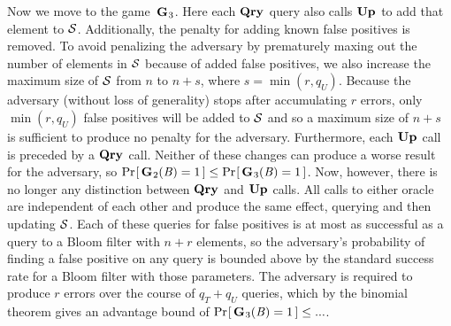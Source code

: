{Now we move to the game~$\textup{\textbf{G}}\hspace{0.5pt}_3$. Here each $\textup{\textbf{Qry}}\hspace{0.5pt}$ query also calls $\textup{\textbf{Up}}\hspace{0.5pt}$ to
add that element to $\mathcal{S}$.   Additionally, the penalty for adding known false
positives is removed. To avoid penalizing the adversary by prematurely maxing
out the number of elements in $\mathcal{S}$ because of added false positives, we also
increase the maximum size of $\mathcal{S}$ from $n$ to $n+s$, where $s = \min(r,q_U)$.
Because the adversary (without loss of generality) stops after accumulating $r$
errors, only $\min(r,q_U)$ false positives will be added to $\mathcal{S}$ and so a
maximum size of $n+s$ is sufficient to produce no penalty for the adversary.
Furthermore, each $\textup{\textbf{Up}}\hspace{0.5pt}$ call is preceded by a $\textup{\textbf{Qry}}\hspace{0.5pt}$ call. Neither of these
changes can produce a worse result for the adversary, so $\Pr\hspace{-1pt}\left[\,\textup{\textbf{G}}\hspace{0.5pt}_2(\mathit{B}) =
1\,\right] \le \Pr\hspace{-1pt}\left[\,\textup{\textbf{G}}\hspace{0.5pt}_3(\mathit{B}) = 1\,\right]$. Now, however, there is no longer any
distinction between $\textup{\textbf{Qry}}\hspace{0.5pt}$ and $\textup{\textbf{Up}}\hspace{0.5pt}$ calls. All calls to either oracle are
independent of each other and produce the same effect, querying and then
updating $\mathcal{S}$. Each of these queries for false positives is at most as
successful as a query to a Bloom filter with $n+r$ elements, so the adversary's
probability of finding a false positive on any query is bounded above by the
standard success rate for a Bloom filter with those parameters. The adversary is
required to produce $r$ errors over the course of $q_T+q_U$ queries, which by
the binomial theorem gives an advantage bound of $\Pr\hspace{-1pt}\left[\,\textup{\textbf{G}}\hspace{0.5pt}_3(\mathit{B}) = 1\,\right] \leq
...$.
%

}